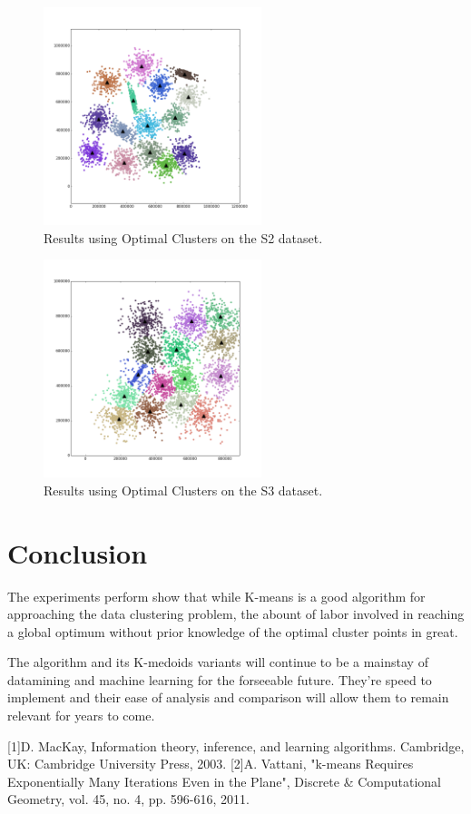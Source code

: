 \documentclass[journal]{IEEEtran}
\begin{document}
\begin{figure}[!t]
	\centering
	\includegraphics[width=2.5in]{../figs/s2_true_euclid_15.png}
	\caption{Results using Optimal Clusters on the S2 dataset.}
	\label{fig_sim}
\end{figure}
\begin{figure}[!t]
	\centering
	\includegraphics[width=2.5in]{../figs/s3_true_euclid_15.png}
	\caption{Results using Optimal Clusters on the S3 dataset.}
	\label{fig_sim}
\end{figure}


\section{Conclusion}
The experiments perform show that while K-means is a good algorithm for approaching the data clustering problem, the abount of labor involved in reaching a global optimum without prior knowledge of the optimal cluster points in great.

The algorithm and its K-medoids variants will continue to be a mainstay of datamining and machine learning for the forseeable future. They're speed to implement and their ease of analysis and comparison will allow them to remain relevant for years to come.

\ifCLASSOPTIONcaptionsoff
  \newpage
\fi
\begin{thebibliography}{1}
	
	D. MacKay, Information theory, inference, and learning algorithms. Cambridge, UK: Cambridge University Press, 2003.
 [2]A.  Vattani, "k-means Requires Exponentially Many Iterations Even in the Plane", Discrete \& Computational Geometry, vol. 45, no. 4, pp. 596-616, 2011.
\end{thebibliography}



\end{document}
